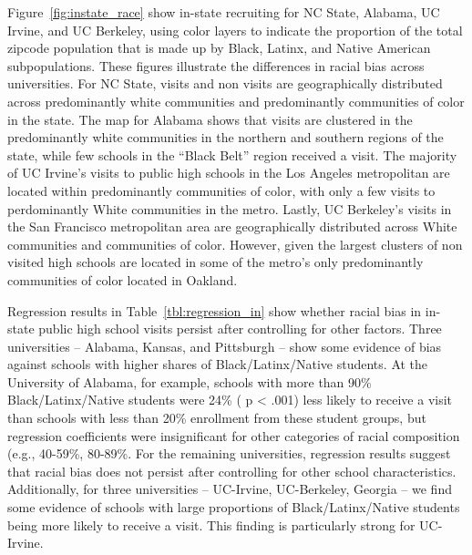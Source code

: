 \documentclass[twoside]{article}
\begin{document}
Figure~\ref{fig:instate_race} show in-state recruiting for NC State, Alabama, UC Irvine, and UC Berkeley, using color layers to indicate the proportion of the total zipcode population that is made up by Black, Latinx, and Native American subpopulations. These figures illustrate the differences in racial bias across universities. For NC State, visits and non visits are geographically distributed across predominantly white communities and predominantly communities of color in the state. The map for Alabama shows that visits are clustered in the predominantly white communities in the northern and southern regions of the state, while few schools in the ``Black Belt'' region received a visit. The majority of UC Irvine's visits to public high schools in the Los Angeles metropolitan are located within predominantly communities of color, with only a few visits to perdominantly White communities in the metro. Lastly, UC Berkeley's visits in the San Francisco metropolitan area are geographically distributed across White communities and communities of color. However, given  the largest clusters of non visited high schools are located in some of the metro's only predominantly communities of color located in Oakland.

Regression results in Table~\ref{tbl:regression_in} show whether racial bias in in-state public high school visits persist after controlling for other factors. Three universities -- Alabama, Kansas, and Pittsburgh -- show some evidence of bias against schools with higher shares of Black/Latinx/Native students. At the University of Alabama, for example, schools with more than 90\% Black/Latinx/Native students were 24\% ( p < .001) less likely to receive a visit than schools with less than 20\% enrollment from these student groups, but regression coefficients were insignificant for other categories of racial composition (e.g., 40-59\%, 80-89\%. For the remaining universities, regression results suggest that racial bias does not persist after controlling for other school characteristics. Additionally, for three universities -- UC-Irvine, UC-Berkeley, Georgia -- we find some evidence of schools with large proportions of Black/Latinx/Native students being more likely to receive a visit. This finding is particularly strong for UC-Irvine.
\end{document}
